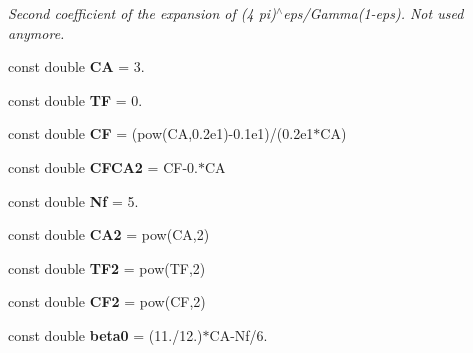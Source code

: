 \begin{DoxyCompactItemize}
\begin{DoxyCompactList}\small\item\em Second coefficient of the expansion of (4 pi)$^\wedge$eps/\-Gamma(1-\/eps). Not used anymore. \end{DoxyCompactList}\item 
\hypertarget{namespaceConstants_ac73849b0c8547416415eef1a561ce0e8}{const double {\bfseries C\-A} = 3.}\label{namespaceConstants_ac73849b0c8547416415eef1a561ce0e8}

\item 
\hypertarget{namespaceConstants_a073f635ee60b7f307aea7d44e8112ab7}{const double {\bfseries T\-F} = 0.}\label{namespaceConstants_a073f635ee60b7f307aea7d44e8112ab7}

\item 
\hypertarget{namespaceConstants_a5010b233cf194ebca5d8054e1749079f}{const double {\bfseries C\-F} = (pow(C\-A,0.\-2e1)-\/0.\-1e1)/(0.\-2e1$\ast$\-C\-A)}\label{namespaceConstants_a5010b233cf194ebca5d8054e1749079f}

\item 
\hypertarget{namespaceConstants_adc8499196efd507f12a0189cdfcfef1b}{const double {\bfseries C\-F\-C\-A2} = C\-F-\/0.$\ast$C\-A}\label{namespaceConstants_adc8499196efd507f12a0189cdfcfef1b}

\item 
\hypertarget{namespaceConstants_abe9c015febc2c7bb30cb74a78d1e2a0b}{const double {\bfseries Nf} = 5.}\label{namespaceConstants_abe9c015febc2c7bb30cb74a78d1e2a0b}

\item 
\hypertarget{namespaceConstants_af447d28502b99a76b64aff04ae71b8ea}{const double {\bfseries C\-A2} = pow(C\-A,2)}\label{namespaceConstants_af447d28502b99a76b64aff04ae71b8ea}

\item 
\hypertarget{namespaceConstants_a826a73ef55ac5464617f400a407ea8c5}{const double {\bfseries T\-F2} = pow(T\-F,2)}\label{namespaceConstants_a826a73ef55ac5464617f400a407ea8c5}

\item 
\hypertarget{namespaceConstants_ab40e0fa2fdc3d4fddddf47cce359ce35}{const double {\bfseries C\-F2} = pow(C\-F,2)}\label{namespaceConstants_ab40e0fa2fdc3d4fddddf47cce359ce35}

\item 
\hypertarget{namespaceConstants_aa5c1145687461e3b3b03a749e820bae8}{const double {\bfseries beta0} = (11./12.)$\ast$C\-A-\/Nf/6.}\label{namespaceConstants_aa5c1145687461e3b3b03a749e820bae8}


\end{DoxyCompactItemize}
